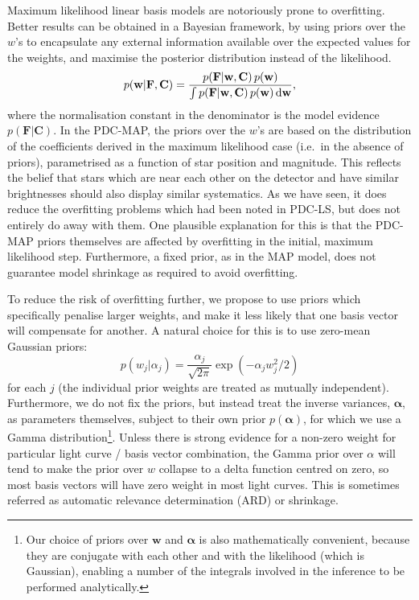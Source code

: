 \documentclass[useAMS,usenatbib]{mn2e}
\begin{document}
Maximum likelihood linear basis models are notoriously prone
to overfitting. Better results can be obtained in a Bayesian
framework, by using
priors over the $w$'s to encapsulate any external information
available over the expected values for the weights, and maximise the
posterior distribution instead of the likelihood. 
\begin{equation}
p(\mathbf{w}|\mathbf{F},\mathbf{C}) =
\frac{p(\mathbf{F}|\mathbf{w},\mathbf{C})  \, p(\mathbf{w})}{\int
  p(\mathbf{F}|\mathbf{w},\mathbf{C}) \, p(\mathbf{w}) \, {\rm d}\mathbf{w}},
\end{equation} 
where the normalisation constant in the denominator is the model
evidence $p(\mathbf{F}|\mathbf{C})$. In the PDC-MAP, the priors over
the $w$'s are based on the distribution of the coefficients derived in
the maximum likelihood case (i.e.\ in the absence of priors),
parametrised as a function of star position and magnitude. This
reflects the belief that stars which are near each other on the
detector and have similar brightnesses should also display similar
systematics. As we have seen, it does reduce the overfitting problems
which had been noted in PDC-LS, but does not entirely do away with
them. One plausible explanation for this is that the PDC-MAP priors
themselves are affected by overfitting in the initial, maximum
likelihood step. Furthermore, a fixed prior, as in the MAP model,
does not guarantee model shrinkage as required to avoid overfitting. 

To reduce the risk of overfitting further, we propose to use priors
which specifically penalise larger weights, and make it less likely
that one basis vector will compensate for another. A natural choice
for this is to use zero-mean Gaussian priors:
\begin{equation}
p(w_j|\alpha_j) = \frac{\alpha_j}{\sqrt{2 \pi}} \exp\left(-\alpha_j w_j^2 / 2 \right)
\end{equation}
for each $j$ (the individual prior weights are treated as
mutually independent).  Furthermore, we do not fix the priors, but
instead treat the inverse variances, $\boldsymbol{\alpha}$, as
parameters themselves, subject to their own prior
$p(\boldsymbol{\alpha})$, for which we use a Gamma
distribution\footnote{Our choice of priors over $\mathbf{w}$ and
  $\boldsymbol{\alpha}$ is also mathematically convenient, because
  they are conjugate with each other and with the likelihood (which is
  Gaussian), enabling a number of the integrals involved in the
  inference to be performed analytically.}. Unless there is strong evidence for a non-zero weight
for particular light curve / basis vector combination, the Gamma prior over
$\alpha$ will tend to make the prior over $w$ collapse to a delta
function centred on zero, so most basis vectors will have zero weight in most
light curves. This is sometimes referred as
automatic relevance determination (ARD) or shrinkage.
\end{document}
